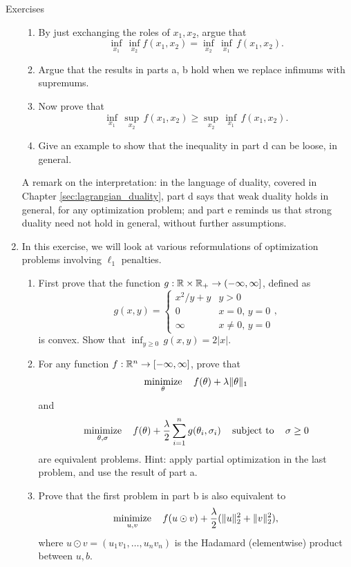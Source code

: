 \begin{xcb}{Exercises}
\begin{enumerate}[label=\thechapter.\arabic*]
\begin{enumerate}[label=\alph*.]
\item By just exchanging the roles of $x_1,x_2$, argue that 
  \[
  \inf_{x_1} \, \inf_{x_2} f(x_1, x_2) = \inf_{x_2} \, \inf_{x_1} \, f(x_1, x_2). 
  \]

\item Argue that the results in parts a, b hold when we replace infimums with 
  supremums. 

\item Now prove that 
  \[
  \inf_{x_1} \, \sup_{x_2} \, f(x_1, x_2) \geq \sup_{x_2} \, \inf_{x_1} \,
  f(x_1,x_2). 
  \]

\item Give an example to show that the inequality in part d can be loose, in
  general. 
\end{enumerate}

\smallskip
A remark on the interpretation: in the language of duality, covered in Chapter
\ref{sec:lagrangian_duality}, part d says that weak duality holds in general,
for any optimization problem; and part e reminds us that strong duality need not
hold in general, without further assumptions.    

\item In this exercise, we will look at various reformulations of optimization
  problems involving $\ell_1$ penalties.
  
\begin{enumerate}[label=\alph*.]
\item First prove that the function $g : \mathbb{R} \times \mathbb{R}_+ \to (-\infty,\infty]$, 
  defined as  
  \[
  g(x,y) = \begin{cases}
  x^2/y + y & y > 0 \\
  0 & x=0, \, y=0 \\
  \infty & x\not=0, \, y=0
  \end{cases},
  \]
  is convex. Show that $\inf_{y \geq 0} \, g(x,y) = 2|x|$. 

\item For any function $f : \mathbb{R}^n \to [-\infty,\infty]$, prove that 
  \[
  \operatorname*{minimize}_\theta \quad f(\theta) + \lambda \|\theta\|_1 
  \]
  and 
  \[
  \operatorname*{minimize}_{\theta, \sigma} \quad f(\theta) + \frac{\lambda}{2} \sum_{i=1}^n 
  g(\theta_i, \sigma_i) \quad \operatorname{subject\,\,to} \quad \sigma \geq 0
  \]
  are equivalent problems. Hint: apply partial optimization in the last problem,  
  and use the result of part a.

\item Prove that the first problem in part b is also equivalent to 
  \[
  \operatorname*{minimize}_{u,v} \quad f(u \odot v) + \frac{\lambda}{2} (\|u\|_2^2 +
  \|v\|_2^2), 
  \]
  where $u \odot v = (u_1v_1, \ldots, u_nv_n)$ is the Hadamard
  (elementwise) product between $u,b$. 


\end{enumerate}
\end{enumerate}
\end{xcb}
